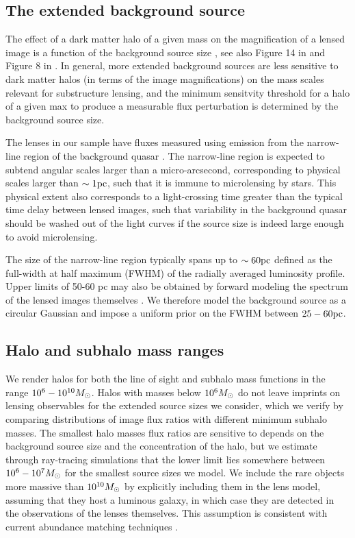 \subsection{The extended background source}
\label{ssec:srcassumptions}
The effect of a dark matter halo of a given mass on the magnification of a lensed image is a function of the background source size \cite{DoblerKeeton02}, see also Figure 14 in \cite{Amara++06} and Figure 8 in \cite{Xu++12}. In general, more extended background sources are less sensitive to dark matter halos (in terms of the image magnifications) on the mass scales relevant for substructure lensing, and the minimum sensitvity threshold for a halo of a given max to produce a measurable flux perturbation is determined by the background source size. 

The lenses in our sample have fluxes measured using emission from the narrow-line region of the background quasar \cite{Nierenberg++17, Nierenberg++19}. The narrow-line region is expected to subtend angular scales larger than a micro-arcsecond, corresponding to physical scales larger than $\sim 1 \rm{pc}$, such that it is immune to microlensing by stars. This physical extent also corresponds to a light-crossing time greater than the typical time delay between lensed images, such that variability in the background quasar should be washed out of the light curves if the source size is indeed large enough to avoid microlensing. 

The size of the narrow-line region typically spans up to $\sim 60 \rm{pc}$ \cite{MullerSanchez++11} defined as the full-width at half maximum (FWHM) of the radially averaged luminosity profile. Upper limits of 50-60 pc may also be obtained by forward modeling the spectrum of the lensed images themselves \cite{Nierenberg++17}. We therefore model the background source as a circular Gaussian and impose a uniform prior on the FWHM between $25 - 60 \rm{pc}$. 

\subsection{Halo and subhalo mass ranges}
We render halos for both the line of sight and subhalo mass functions in the range $10^6 - 10^{10} {M_{\odot}}$. Halos with masses below $10^{6} {M_{\odot}}$ do not leave imprints on lensing observables for the extended source sizes we consider, which we verify by comparing distributions of image flux ratios with different minimum subhalo masses. The smallest halo masses flux ratios are sensitive to depends on the background source size and the concentration of the halo, but we estimate through ray-tracing simulations that the lower limit lies somewhere between $10^6  - 10^7 {M_{\odot}}$ for the smallest source sizes we model. We include the rare objects more massive than $10^{10} {M_{\odot}}$ by explicitly including them in the lens model, assuming that they host a luminous galaxy, in which case they are detected in the observations of the lenses themselves. This assumption is consistent with current abundance matching techniques \cite{Kim++17b,Nadler++19}. 

